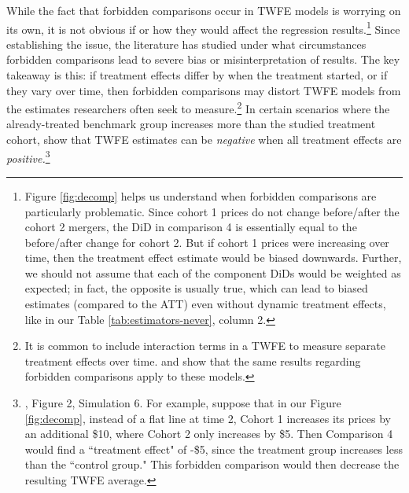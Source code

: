\documentclass[12pt]{article}
\begin{document}
While the fact that forbidden comparisons occur in TWFE models is worrying on its own, it is not obvious if or how they would affect the regression results.\footnote{Figure \ref{fig:decomp} helps us understand when forbidden comparisons are particularly problematic. Since cohort 1 prices do not change before/after the cohort 2 mergers, the DiD in comparison 4 is essentially equal to the before/after change for cohort 2. But if cohort 1 prices were increasing over time, then the treatment effect estimate would be biased downwards. Further, we should not assume that each of the component DiDs would be weighted as expected; in fact, the opposite is usually true, which can lead to biased estimates (compared to the ATT) even without dynamic treatment effects, like in our Table \ref{tab:estimators-never}, column 2.} Since establishing the issue, the literature has studied under what circumstances forbidden comparisons lead to severe bias or misinterpretation of results. The key takeaway is this: if treatment effects differ by when the treatment started, or if they vary over time, then forbidden comparisons may distort TWFE models from the estimates researchers often seek to measure.\footnote{It is common to include interaction terms in a TWFE to measure separate treatment effects over time. \citet{sunabr2021a} and \citet{borusyak2024revisiting} show that the same results regarding forbidden comparisons apply to these models.} In certain scenarios where the already-treated benchmark group increases more than the studied treatment cohort, \citet{baker2022much} show that TWFE estimates can be \textit{negative} when all treatment effects are \textit{positive.}\footnote{\citet{baker2022much}, Figure 2, Simulation 6. For example, suppose that in our Figure \ref{fig:decomp}, instead of a flat line at time 2, Cohort 1 increases its prices by an additional \$10, where Cohort 2 only increases by \$5. Then Comparison 4 would find a ``treatment effect" of -\$5, since the treatment group increases less than the ``control group." This forbidden comparison would then decrease the resulting TWFE average.} 
\end{document}

